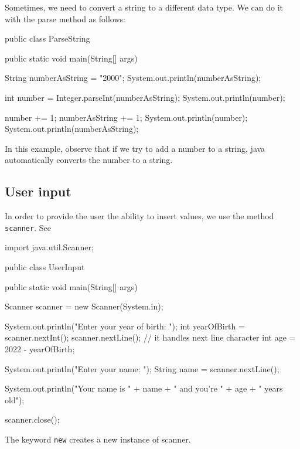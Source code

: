 Sometimes, we need to convert a string to a different data type. We can do it 
with the parse method as follows:
\begin{listing}{1}
public class ParseString {
   public static void main(String[] args) {
   String numberAsString = "2000";
   System.out.println(numberAsString);

   int number = Integer.parseInt(numberAsString);
   System.out.println(number);

   number += 1;
   numberAsString += 1;
   System.out.println(number);
   System.out.println(numberAsString);
   }

}
\end{listing}
In this example, observe that if we try to add a number to a string, java automatically converts
the number to a string.


\subsection{User input}

In order to provide the user the ability to insert values, we use the method \verb|scanner|. See
\begin{listing}{1}
import java.util.Scanner;

public class UserInput {

   public static void main(String[] args) {

   Scanner scanner = new Scanner(System.in);

   System.out.println("Enter your year of birth: ");
   int yearOfBirth = scanner.nextInt();
   scanner.nextLine(); // it handles next line character
   int age = 2022 - yearOfBirth;

   System.out.println("Enter your name: ");
   String name = scanner.nextLine();

   System.out.println("Your name is " + name + " and you're " + age + " years old");

   scanner.close();
   }
}
\end{listing}
The keyword \verb|new| creates a new instance of scanner.


